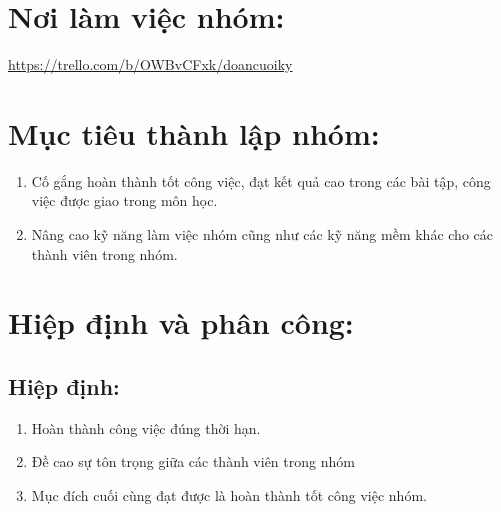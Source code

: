 \documentclass[a4paper,14pt]{extreport}
\begin{document}
\section{Nơi làm việc nhóm:}
\url{https://trello.com/b/OWBvCFxk/doancuoiky}
\section{Mục tiêu thành lập nhóm:}
\begin{enumerate}[-]
\item Cố gắng hoàn thành tốt công việc, đạt kết quả cao trong các bài tập, công việc được giao trong môn học.
\item	Nâng cao kỹ năng làm việc nhóm cũng như các kỹ năng mềm khác cho các thành viên trong nhóm.
\end{enumerate}
\section{ Hiệp định và phân công:}
\subsection { Hiệp định:}
\begin{enumerate}[-]
\item Hoàn thành công việc đúng thời hạn.
\item Đề cao sự tôn trọng  giữa các thành viên trong nhóm
\item Mục đích cuối cùng đạt được là hoàn thành tốt công việc nhóm.
\end{enumerate}
\end{document}
